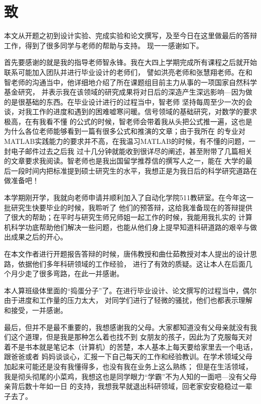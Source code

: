 \chapter*{致}
本文从开题之初到设计实验、完成实验和论文撰写，及至今日在这里做最后的答辩工作，得到了很多同学与老师的帮助与支持。
现一一感谢如下。
\par
首先要感谢的就是我的指导老师智永锋。我在大四上学期完成所有课程之后就开始联系可能加入团队并进行毕业设计的老师们，
譬如洪亮老师和张慧翔老师。在和智老师的沟通当中，他详细地介绍了所在课题组目前主力从事的一项国家自然科学基金研究，
并表示我在该领域的研究成果将对日后的深造产生深远影响---因为做的是很基础的东西。在毕业设计进行的过程当中，智老师
坚持每周至少一次的会谈，对我工作的进度和遇到的困难嘘寒问暖。信号领域的基础研究，对数学的要求极高，在有我看不懂
的公式的时候，智老师会带着我从头把公式推一遍，这也是为什么各位老师能够看到一篇有很多公式和推演的文章；由于我所在
的专业对MATLAB实践能力的要求并不高，在我温习MATLAB的时候，有不懂的问题，一封电子邮件过去之后我
过十几分钟就能收到很详尽的阐述，甚至附带了几篇相关的文章要求我阅读。智老师也是我出国留学推荐信的撰写人之一，能在
大学的最后一段时间内把标准提到硕士研究生的水平，我想正是为我日后的科学研究道路在做准备吧！
\par
本学期刚开学，我就向老师申请并顺利加入了自动化学院511教研室。在今年这一批研究生快要毕业的时候，我聆听了
他们的预答辩，这给我准备现在的答辩提供了很大的帮助；在平时与研究生师兄师姐一起工作的时候，我能用我扎实的
计算机科学功底帮助他们解决一些问题，也能从他们身上提早知道科研道路的艰辛与做出成果之后的开心。
\par
在本文作者进行开题报告答辩的时候，唐伟教授和曲仕茹教授对本人提出的设计思路，依据他们多年科研领域的工作经验，
进行了有效的质疑。这让本人在后面几个月少走了很多弯路，在此一并感谢。
\par
本人算班级体里面的“捣蛋分子”了。在进行毕业设计、论文撰写的过程当中，偶尔由于进度和工作量的压力太大，
对同学们进行了轻微的骚扰，他们也都表示理解和接受，一并感谢。
\par
最后，但并不是最不重要的，我想感谢我的父母。大家都知道没有父母亲就没有我们这个道理，但是我是那种怎么着也找不到
女朋友的孩子，因此为了克服每天对着不是书本就是笔记本（计算机）的苦楚，本人基本上每天要给家里去一个电话，跟爸爸或者
妈妈谈谈心，汇报一下自己每天的工作和经验教训。在学术领域父母加起来可能还是没有我懂得多，也没有我在业务上这么熟练；
但是在生活领域，我是彻头彻尾的小菜鸡，我想这也是同学眼力“学霸”不为人知的一面吧---没有父母亲背后数十年如一日
的支持，我想我早就退出科研领域，回老家安安稳稳过一辈子去了。


